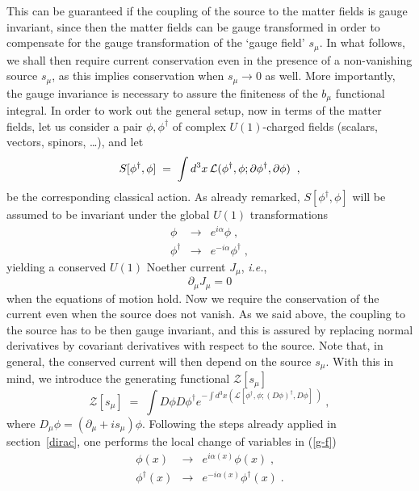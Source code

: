 \documentclass[a4paper,12pt]{article}
\begin{document}
This can be guaranteed if the coupling of the source to the matter
fields is gauge invariant, since then the matter fields can be gauge
transformed in order to compensate for the gauge transformation of the
`gauge field' $s_\mu$. In what follows, we shall then require current
conservation even in the presence of a non-vanishing source $s_\mu$,
as this implies conservation when $s_\mu \to 0$ as well. More
importantly, the gauge invariance is necessary to assure the
finiteness of the $b_\mu$ functional integral.
In order to work out the general setup, now in terms of the matter
fields,  let us consider a pair $%
\phi ,\phi ^{\dagger }$ of complex $U(1)$-charged fields (scalars, vectors,
spinors, \ldots), and let
\begin{equation}
  \label{ac}
S[\phi^\dagger, \phi]\;=\;\int d^3x \,{\cal L}(\phi^\dagger, \phi ;
\partial \phi^\dagger, \partial \phi )\;\;,
\end{equation}
be the corresponding classical action. As already remarked, $S[\phi^\dagger,
\phi]$ will be assumed to be invariant under the global $U(1)$
transformations
\begin{eqnarray}
\phi &\to &e^{i\alpha }\phi \;,  \label{u1tr} \\
\phi ^{\dagger } &\to &e^{-i\alpha }\phi ^{\dagger }\;,  \nonumber
\end{eqnarray}
yielding a conserved $U(1)$ Noether current $J_\mu $, {\it i.e.},
\begin{equation}
 \label{u1curr}
\partial _\mu J_\mu =0
\end{equation}
when the equations of motion hold. Now we require the conservation of
the current even when the source does not vanish. As we said above,
the coupling to the source has to be then gauge invariant, and this is
assured by replacing normal derivatives by covariant derivatives with
respect to the source. Note that, in general, the conserved current
will then depend on the source $s_\mu$.  With this in mind, we introduce
the generating functional ${\mathcal Z}[s_\mu]$
\begin{equation}
  \label{g-f}
{\mathcal Z}[s_\mu]\;=\; \int D\phi D\phi ^{\dagger }e^{-\int d^3x\left( {\mathcal L}%
[\phi^\dagger,\phi;(D\phi)^\dagger,D\phi]\; \right)} \ ,
\end{equation}
where $D_\mu\phi=(\partial_{\mu}+is_\mu) \phi$.  Following the steps already applied in
section~\ref{dirac}, one performs the local change of variables in
(\ref{g-f})
\begin{eqnarray}
\phi (x) &\to &e^{i\alpha (x)}\phi (x)\;,  \label{u1-loc} \\
\phi ^{\dagger }(x) &\to &e^{-i\alpha (x)}\phi ^{\dagger }(x)\;.
\nonumber
\end{eqnarray}
\end{document}
